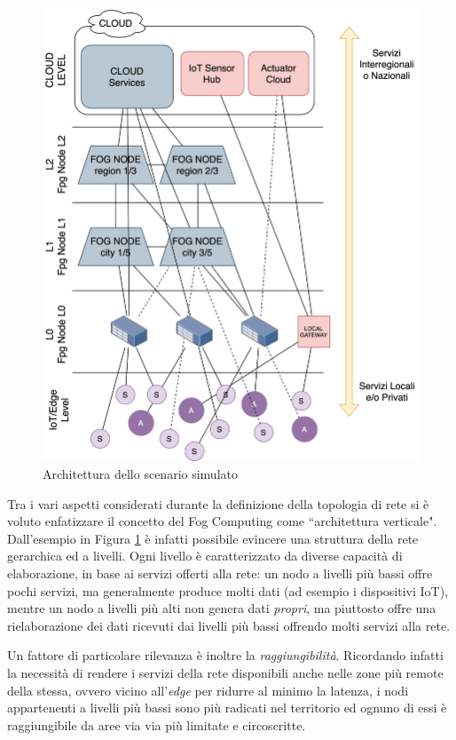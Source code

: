 \begin{figure}[!ht]
  \includegraphics[width=14cm]{images/architettura_scenario}
  \centering
  \caption{Architettura dello scenario simulato}
  \label{fig:architettura_scenario}
\end{figure}

Tra i vari aspetti considerati durante la definizione della topologia di rete si è voluto enfatizzare il concetto del Fog Computing come ``architettura verticale". Dall'esempio in Figura \ref{fig:architettura_scenario} è infatti possibile evincere una struttura della rete gerarchica ed a livelli. Ogni livello è caratterizzato da diverse capacità di elaborazione, in base ai servizi offerti alla rete: un nodo a livelli più bassi offre pochi servizi, ma generalmente produce molti dati (ad esempio i dispositivi IoT), mentre un nodo a livelli più alti non genera dati \textit{propri}, ma piuttosto offre una rielaborazione dei dati ricevuti dai livelli più bassi offrendo molti servizi alla rete.

Un fattore di particolare rilevanza è inoltre la \textit{raggiungibilità}. Ricordando infatti la necessità di rendere i servizi della rete disponibili anche nelle zone più remote della stessa, ovvero vicino all'\textit{edge} per ridurre al minimo la latenza, i nodi appartenenti a livelli più bassi sono più radicati nel territorio ed ognuno di essi è raggiungibile da aree via via più limitate e circoscritte. 

